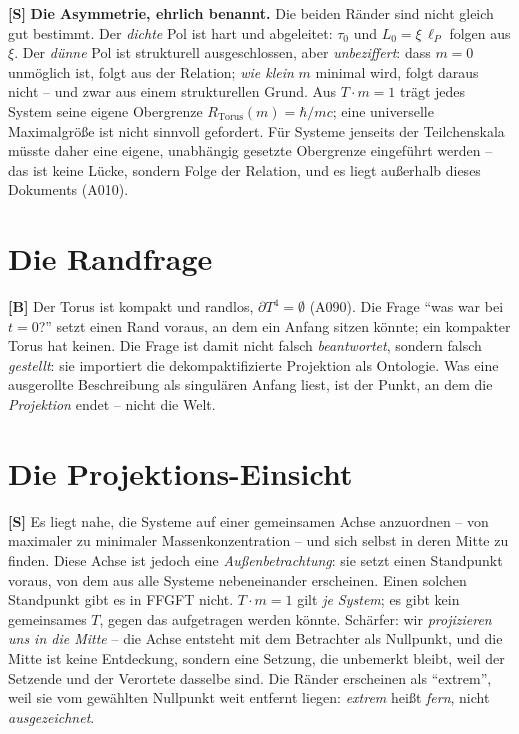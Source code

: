\textbf{[S]} \textbf{Die Asymmetrie, ehrlich benannt.} Die beiden Ränder sind
nicht gleich gut bestimmt. Der \emph{dichte} Pol ist hart und abgeleitet: $\tau_0$
und $L_0=\xi\,\ell_P$ folgen aus $\xi$. Der \emph{dünne} Pol ist strukturell
ausgeschlossen, aber \emph{unbeziffert}: dass $m=0$ unmöglich ist, folgt aus der
Relation; \emph{wie klein} $m$ minimal wird, folgt daraus nicht -- und zwar aus
einem strukturellen Grund. Aus $T\cdot m=1$ trägt jedes System seine eigene
Obergrenze $R_\text{Torus}(m)=\hbar/mc$; eine universelle Maximalgröße ist nicht
sinnvoll gefordert. Für Systeme jenseits der Teilchenskala müsste daher eine
eigene, unabhängig gesetzte Obergrenze eingeführt werden -- das ist keine Lücke,
sondern Folge der Relation, und es liegt außerhalb dieses Dokuments (A010).

\section{Die Randfrage}

\textbf{[B]} Der Torus ist kompakt und randlos, $\partial T^4=\emptyset$ (A090).
Die Frage \enquote{was war bei $t=0$?} setzt einen Rand voraus, an dem ein Anfang
sitzen könnte; ein kompakter Torus hat keinen. Die Frage ist damit nicht falsch
\emph{beantwortet}, sondern falsch \emph{gestellt}: sie importiert die
dekompaktifizierte Projektion als Ontologie. Was eine ausgerollte Beschreibung als
singulären Anfang liest, ist der Punkt, an dem die \emph{Projektion} endet -- nicht
die Welt.

\section{Die Projektions-Einsicht}

\textbf{[S]} Es liegt nahe, die Systeme auf einer gemeinsamen Achse anzuordnen --
von maximaler zu minimaler Massenkonzentration -- und sich selbst in deren Mitte
zu finden. Diese Achse ist jedoch eine \emph{Außenbetrachtung}: sie setzt einen
Standpunkt voraus, von dem aus alle Systeme nebeneinander erscheinen. Einen
solchen Standpunkt gibt es in FFGFT nicht. $T\cdot m=1$ gilt \emph{je System}; es
gibt kein gemeinsames $T$, gegen das aufgetragen werden könnte. Schärfer: wir
\emph{projizieren uns in die Mitte} -- die Achse entsteht mit dem Betrachter als
Nullpunkt, und die Mitte ist keine Entdeckung, sondern eine Setzung, die
unbemerkt bleibt, weil der Setzende und der Verortete dasselbe sind. Die Ränder
erscheinen als \enquote{extrem}, weil sie vom gewählten Nullpunkt weit entfernt
liegen: \emph{extrem} heißt \emph{fern}, nicht \emph{ausgezeichnet}.


